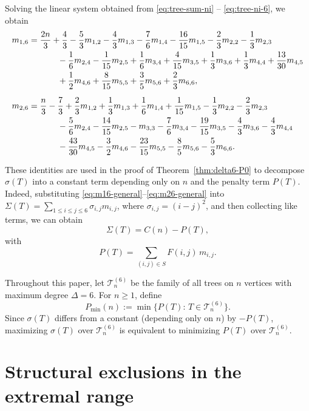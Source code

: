 \documentclass[preprint,12pt]{elsarticle}
\begin{document}
\medskip
Solving the linear system obtained from
\eqref{eq:tree-sum-ni} -- \eqref{eq:tree-ni-6},
we obtain
\begin{align}
m_{1,6}
&=
\frac{2n}{3}+\frac{4}{3}
-\frac{5}{3}m_{1,2}
-\frac{4}{3}m_{1,3}
-\frac{7}{6}m_{1,4}
-\frac{16}{15}m_{1,5}
-\frac{2}{3}m_{2,2}
-\frac{1}{3}m_{2,3}
\nonumber\\
&\hspace{1.2cm}
-\frac{1}{6}m_{2,4}
-\frac{1}{15}m_{2,5}
+\frac{1}{6}m_{3,4}
+\frac{4}{15}m_{3,5}
+\frac{1}{3}m_{3,6}
+\frac{1}{3}m_{4,4}
+\frac{13}{30}m_{4,5}
\nonumber\\
&\hspace{1.2cm}
+\frac{1}{2}m_{4,6}
+\frac{8}{15}m_{5,5}
+\frac{3}{5}m_{5,6}
+\frac{2}{3}m_{6,6},
\label{eq:m16-general}
\\[2mm]
m_{2,6}
&=
\frac{n}{3}-\frac{7}{3}
+\frac{2}{3}m_{1,2}
+\frac{1}{3}m_{1,3}
+\frac{1}{6}m_{1,4}
+\frac{1}{15}m_{1,5}
-\frac{1}{3}m_{2,2}
-\frac{2}{3}m_{2,3}
\nonumber\\
&\hspace{1.2cm}
-\frac{5}{6}m_{2,4}
-\frac{14}{15}m_{2,5}
-m_{3,3}
-\frac{7}{6}m_{3,4}
-\frac{19}{15}m_{3,5}
-\frac{4}{3}m_{3,6}
-\frac{4}{3}m_{4,4}
\nonumber\\
&\hspace{1.2cm}
-\frac{43}{30}m_{4,5}
-\frac{3}{2}m_{4,6}
-\frac{23}{15}m_{5,5}
-\frac{8}{5}m_{5,6}
-\frac{5}{3}m_{6,6}.
\label{eq:m26-general}
\end{align}

These identities are used in the proof of Theorem~\ref{thm:delta6-P0} to decompose
$\sigma(T)$ into a constant term depending only on $n$ and the penalty term $P(T)$. Indeed, substituting \eqref{eq:m16-general}–\eqref{eq:m26-general} into
$\Sigma(T)=\sum_{1\le i\le j\le 6}\sigma_{i,j}m_{i,j}$, where
$\sigma_{i,j}=(i-j)^2$,
and then collecting like terms, we can obtain
\[
\Sigma(T)=C(n)-P(T),
\]
with
\[
P(T)=\sum_{(i,j)\in S}F(i,j)\,m_{i,j}.
\]

\medskip
Throughout this paper, let $\mathcal{T}_n^{(6)}$ be the family of all trees on $n$
vertices with maximum degree $\Delta=6$. For $n\ge 1$, define
\[
P_{\min}(n):=\min\{P(T):\, T\in \mathcal{T}_n^{(6)}\}.
\]
Since $\sigma(T)$ differs from a constant (depending only on $n$) by $-P(T)$, maximizing
$\sigma(T)$ over $\mathcal{T}_n^{(6)}$ is equivalent to minimizing $P(T)$ over
$\mathcal{T}_n^{(6)}$.

\section{Structural exclusions in the extremal range}
\label{sec:exclusions}
\end{document}
